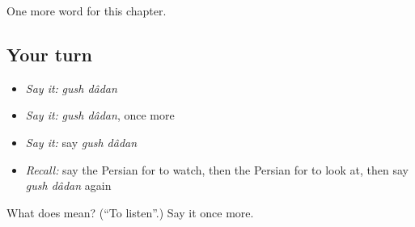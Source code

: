 \begin{grammarlens}[title={What you've built}]
One more word for this chapter.
\end{grammarlens}

\subsection*{Your turn}
\begin{itemize}
\raggedright
  \item \emph{Say it:} \emph{gush dâdan}
  \item \emph{Say it:} \emph{gush dâdan}, once more
  \item \emph{Say it:} say \emph{gush dâdan}
  \item \emph{Recall:} say the Persian for to watch, then the Persian for to look at, then say \emph{gush dâdan} again
\end{itemize}

\begin{tcolorbox}[breakable,colback=teal!4,colframe=teal!35!black,title={Before you move on}]
What does   mean? (\textquotedblleft{}To listen\textquotedblright{}.) Say it once more.
\end{tcolorbox}
